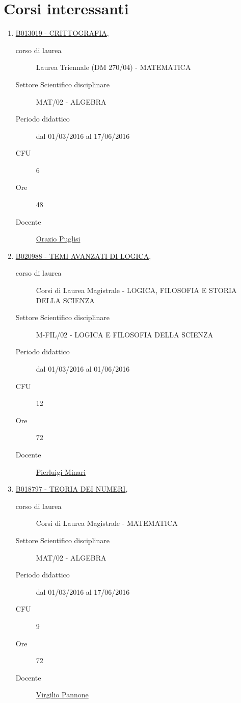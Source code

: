 \documentclass[11pt]{article}
\begin{document}
\section*{Corsi interessanti}

\begin{enumerate}

\item \href{http://www.unifi.it/index.php?module=ofform2&mode=1&cmd=3&AA=2015&afId=359747}{B013019 - CRITTOGRAFIA},
    \begin{description}
        \item[corso di laurea] Laurea Triennale (DM 270/04) - MATEMATICA
        \item[Settore Scientifico disciplinare] MAT/02 - ALGEBRA
        \item[Periodo didattico] dal 01/03/2016 al 17/06/2016
        \item[CFU] 6
        \item[Ore] 48
        \item[Docente] \href{http://www.unifi.it/p-doc2-2015-0-A-2b333c2b3228-0.html}{Orazio Puglisi}

    \end{description}

\item \href{http://www.unifi.it/index.php?module=ofform2&mode=1&cmd=3&AA=2015&afId=427440}{B020988 - TEMI AVANZATI DI LOGICA},
    \begin{description}
        \item[corso di laurea] Corsi di Laurea Magistrale - LOGICA, FILOSOFIA E STORIA DELLA SCIENZA
        \item[Settore Scientifico disciplinare] M-FIL/02 - LOGICA E FILOSOFIA DELLA SCIENZA
        \item[Periodo didattico] dal 01/03/2016 al 01/06/2016
        \item[CFU] 12 
        \item[Ore] 72
        \item[Docente] \href{http://www.unifi.it/p-doc2-2015-0-A-2b333b2c362a-0.html}{Pierluigi Minari}

    \end{description}

\item \href{http://www.unifi.it/index.php?module=ofform2&mode=1&cmd=3&AA=2015&afId=426607}{B018797 - TEORIA DEI NUMERI},
    \begin{description}
        \item[corso di laurea] Corsi di Laurea Magistrale - MATEMATICA
        \item[Settore Scientifico disciplinare] MAT/02 - ALGEBRA
        \item[Periodo didattico] dal 01/03/2016 al 17/06/2016
        \item[CFU] 9 
        \item[Ore] 72
        \item[Docente] \href{http://www.unifi.it/index.php?module=ofform2&mode=1&cmd=3&AA=2015&afId=426607}{Virgilio Pannone}

    \end{description}

\end{enumerate}
\end{document}
